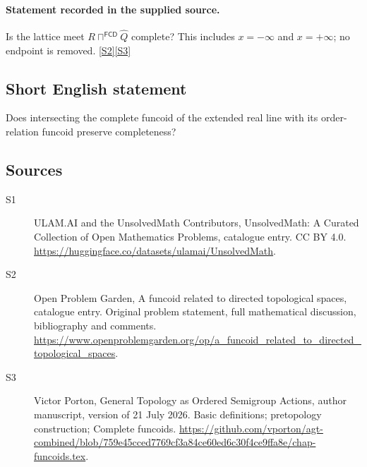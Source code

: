 \documentclass[11pt]{article}
\newcommand{\sref}[2]{\hyperlink{source:#1:#2}{[S#2]}}
\begin{document}
\paragraph{Statement recorded in the supplied source.}
Is the lattice meet $R\sqcap^{\mathsf{FCD}}\widehat Q$ complete? This includes $x=-\infty$ and $x=+\infty$; no endpoint is removed. \sref{statement}{2}\sref{statement}{3}
\subsection{Short English statement}
Does intersecting the complete funcoid of the extended real line with its order-relation funcoid preserve completeness?
\subsection{Sources}
\begin{description}
\item[\hypertarget{source:statement:1}{S1}] ULAM.AI and the UnsolvedMath Contributors, UnsolvedMath: A Curated Collection of Open Mathematics Problems, catalogue entry. CC BY 4.0. \url{https://huggingface.co/datasets/ulamai/UnsolvedMath}.
\item[\hypertarget{source:statement:2}{S2}] Open Problem Garden, A funcoid related to directed topological spaces, catalogue entry. Original problem statement, full mathematical discussion, bibliography and comments. \url{https://www.openproblemgarden.org/op/a_funcoid_related_to_directed_topological_spaces}.
\item[\hypertarget{source:statement:3}{S3}] Victor Porton, General Topology as Ordered Semigroup Actions, author manuscript, version of 21 July 2026. Basic definitions; pretopology construction; Complete funcoids. \url{https://github.com/vporton/agt-combined/blob/759e45cced7769cf3a84ce60ed6c30f4ce9ffa8e/chap-funcoids.tex}.
\end{description}
\label{end:statement}
\end{document}
